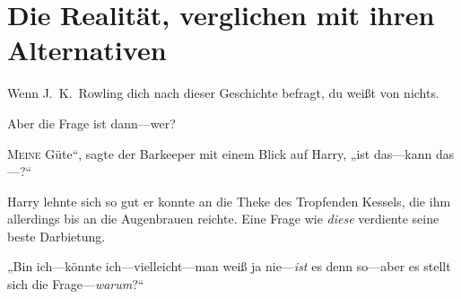 \chapter{Die Realität, verglichen mit ihren Alternativen}

\begin{chapterOpeningAuthorNote}
Wenn J.~K.~Rowling dich nach dieser Geschichte befragt, du weißt von nichts.
\end{chapterOpeningAuthorNote}
\begin{chapterOpeningQuote}
Aber die Frage ist dann—wer?
\end{chapterOpeningQuote}

\lettrine[ante=„]{M}{eine} Güte“, sagte der Barkeeper mit einem Blick auf Harry, „ist das—kann das—?“

Harry lehnte sich so gut er konnte an die Theke des Tropfenden Kessels, die ihm allerdings bis an die Augenbrauen reichte. Eine Frage wie \emph{diese} verdiente seine beste Darbietung.

„Bin ich—könnte ich—vielleicht—man weiß ja nie—\emph{ist} es denn so—aber es stellt sich die Frage—\emph{warum}?“

